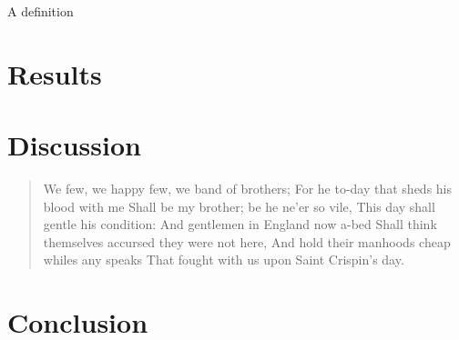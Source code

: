\begin{definition}
A definition
\end{definition}

\begin{note}
\lipsum[1]
\end{note}

\begin{remark}
\lipsum[1]
\end{remark}

\chapter{Results}

\lipsum
\chapter{Discussion}

\begin{quote}
We few, we happy few, we band of brothers;
For he to-day that sheds his blood with me
Shall be my brother; be he ne'er so vile,
This day shall gentle his condition:
And gentlemen in England now a-bed
Shall think themselves accursed they were not here,
And hold their manhoods cheap whiles any speaks
That fought with us upon Saint Crispin's day.
\end{quote}

\lipsum[2-4]

\chapter{Conclusion}

\lipsum

\backmatter
\printbibliography
\cleardoublepage
\listoftheorems[ignore={note,remark}]


